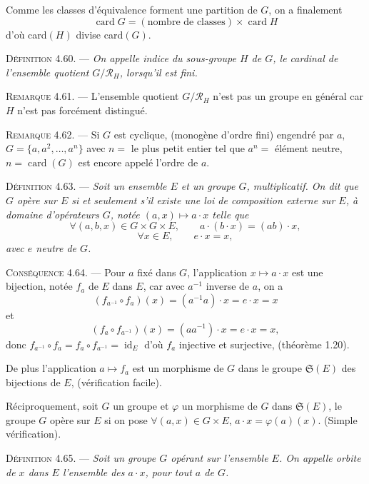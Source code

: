 Comme les classes d'équivalence forment une partition de $G$, on a finalement
\[
\operatorname{card}G=(\text{nombre de classes})\times\operatorname{card}H
\]
d'où card$(H)$ divise card$(G)$. \bookend

\medskip\noindent\textsc{Définition 4.60.} --- \emph{On appelle indice du sous-groupe $H$ de $G$, le cardinal de l'ensemble quotient $G/\mathcal R_H$, lorsqu'il est fini.}

\medskip\noindent\textsc{Remarque 4.61.} --- L'ensemble quotient $G/\mathcal R_H$ n'est pas un groupe en général car $H$ n'est pas forcément distingué.

\medskip\noindent\textsc{Remarque 4.62.} --- Si $G$ est cyclique, (monogène d'ordre fini) engendré par $a$, $G=\{a,a^2,\ldots,a^n\}$ avec $n=$ le plus petit entier tel que $a^n=$ élément neutre, $n=\operatorname{card}(G)$ est encore appelé l'ordre de $a$.


\medskip\noindent\textsc{Définition 4.63.} --- \emph{Soit un ensemble $E$ et un groupe $G$, multiplicatif. On dit que $G$ opère sur $E$ si et seulement s'il existe une loi de composition externe sur $E$, à domaine d'opérateurs $G$, notée $(a,x)\mapsto a\cdot x$ telle que
\[
\forall(a,b,x)\in G\times G\times E,\qquad a\cdot(b\cdot x)=(ab)\cdot x,
\]
\[
\forall x\in E,\qquad e\cdot x=x,
\]
avec $e$ neutre de $G$.}

\medskip\noindent\textsc{Conséquence 4.64.} --- Pour $a$ fixé dans $G$, l'application $x\mapsto a\cdot x$ est une bijection, notée $f_a$ de $E$ dans $E$, car avec $a^{-1}$ inverse de $a$, on a
\[
(f_{a^{-1}}\circ f_a)(x)=(a^{-1}a)\cdot x=e\cdot x=x
\]
et
\[
(f_a\circ f_{a^{-1}})(x)=(aa^{-1})\cdot x=e\cdot x=x,
\]
donc $f_{a^{-1}}\circ f_a=f_a\circ f_{a^{-1}}=\operatorname{id}_E$ d'où $f_a$ injective et surjective, (théorème 1.20). \bookend

De plus l'application $a\mapsto f_a$ est un morphisme de $G$ dans le groupe $\mathfrak S(E)$ des bijections de $E$, (vérification facile).

Réciproquement, soit $G$ un groupe et $\varphi$ un morphisme de $G$ dans $\mathfrak S(E)$, le groupe $G$ opère sur $E$ si on pose $\forall(a,x)\in G\times E$, $a\cdot x=\varphi(a)(x)$. (Simple vérification).

\medskip\noindent\textsc{Définition 4.65.} --- \emph{Soit un groupe $G$ opérant sur l'ensemble $E$. On appelle orbite de $x$ dans $E$ l'ensemble des $a\cdot x$, pour tout $a$ de $G$.}

